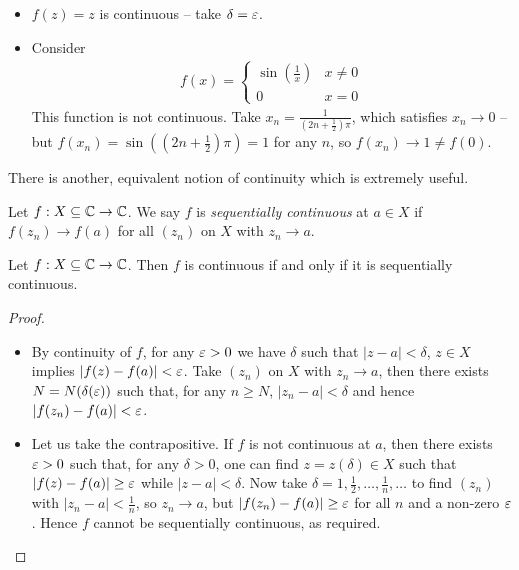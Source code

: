 \documentclass{../../template/note}
\begin{document}
    \begin{example}
        \begin{itemize}
            \item \(f(z) = z\) is continuous -- take \(\delta = \varepsilon\).
            \item Consider \begin{align*}
                f(x) = \begin{cases}
                    \sin\left(\frac 1 x\right) & x \neq 0 \\
                    0 & x = 0
                \end{cases}
            \end{align*}
            This function is not continuous. Take \(x_n = \frac{1}{(2n+\frac 1 2)\pi}\), which satisfies \(x_n \to 0\) -- but \(f(x_n) = \sin\left(\left(2n+\frac 1 2\right)\pi\right) = 1\) for any \(n\), so \(f(x_n) \to 1 \neq f(0)\).
        \end{itemize}
    \end{example}
    
    
    There is another, equivalent notion of continuity which is extremely useful.

    \begin{definition}
        Let \(f: X \subseteq \mathbb C \to \mathbb C\). We say \(f\) is \emph{sequentially continuous} at \(a \in X\) if \(f(z_n) \to f(a)\) for all \((z_n)\) on \(X\) with \(z_n \to a\).
    \end{definition}
    
    \begin{proposition}
        Let \(f: X \subseteq \mathbb C \to \mathbb C\). Then \(f\) is continuous if and only if it is sequentially continuous.
    \end{proposition}
    
    \begin{proof}
        \begin{itemize}
            \item[\(\implies\)] By continuity of \(f\), for any \(\varepsilon > 0\) we have \(\delta\) such that \(|z-a| < \delta\), \(z \in X\) implies \(|f(z) - f(a)| < \varepsilon\). Take \((z_n)\) on \(X\) with \(z_n \to a\), then there exists \(N = N(\delta(\varepsilon))\) such that, for any \(n \geq N\), \(|z_n-a| < \delta\) and hence \(|f(z_n)-f(a)| < \varepsilon\).
            \item[\(\impliedby\)] Let us take the contrapositive. If \(f\) is not continuous at \(a\), then there exists \(\varepsilon > 0\) such that, for any \(\delta > 0\), one can find \(z = z(\delta) \in X\) such that \(|f(z)-f(a)| \geq \varepsilon\) while \(|z-a| < \delta\). Now take \(\delta = 1, \frac 1 2, \dots, \frac 1 n, \dots\) to find \((z_n)\) with \(|z_n-a| < \frac 1 n\), so \(z_n \to a\), but \(|f(z_n)-f(a)| \geq \varepsilon\) for all \(n\) and a non-zero \(\varepsilon\). Hence \(f\) cannot be sequentially continuous, as required.
        \end{itemize}
    \end{proof}
    
\end{document}
